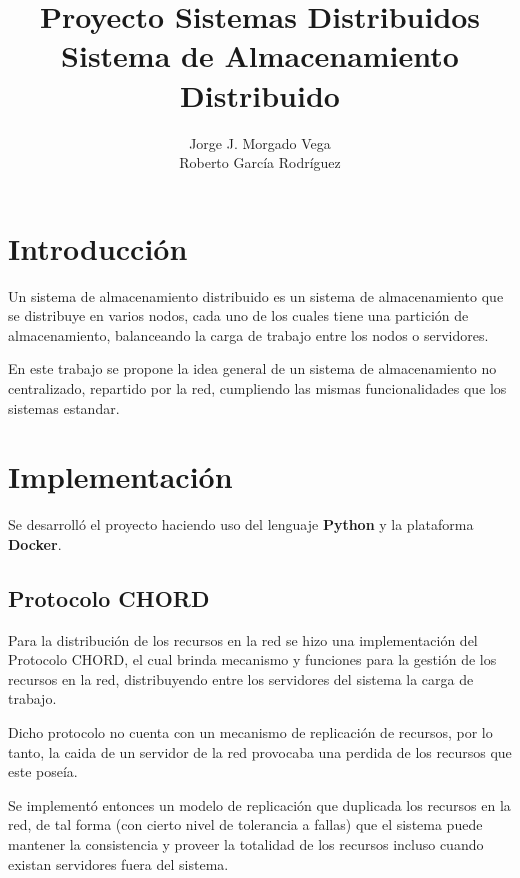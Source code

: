 \documentclass[12pt]{article}
\begin{document}
	\title{Proyecto Sistemas Distribuidos\\Sistema de Almacenamiento Distribuido}
	\author{Jorge J. Morgado Vega\\Roberto García Rodríguez}
	\date{}
	\maketitle

    \section{Introducción}
        Un sistema de almacenamiento distribuido es un sistema de almacenamiento
        que se distribuye en varios nodos, cada uno de los cuales tiene una
        partición de almacenamiento, balanceando la carga de trabajo entre los
        nodos o servidores.

        En este trabajo se propone la idea general de un sistema de almacenamiento
        no centralizado, repartido por la red, cumpliendo las mismas funcionalidades
        que los sistemas estandar.

    \section{Implementación}
        Se desarrolló el proyecto haciendo uso del lenguaje \textbf{Python}
        y la plataforma \textbf{Docker}.

    \subsection{Protocolo CHORD}
        Para la distribución de los recursos en la red se hizo una
        implementación del Protocolo CHORD, el cual brinda mecanismo y funciones
        para la gestión de los recursos en la red, distribuyendo entre los
        servidores del sistema la carga de trabajo.

        Dicho protocolo no cuenta con un mecanismo de replicación de
        recursos, por lo tanto, la caida de un servidor de la red provocaba
        una perdida de los recursos que este poseía.

        Se implementó entonces un modelo de replicación que duplicada los
        recursos en la red, de tal forma (con cierto nivel de tolerancia a
        fallas) que el sistema puede mantener la consistencia y proveer la
        totalidad de los recursos incluso cuando existan servidores fuera
        del sistema.
\end{document}
